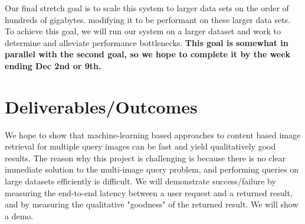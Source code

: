 Our final stretch goal is to scale this system to larger data sets on the order of hundreds of gigabytes.
modifying it to be performant on these larger data sets.
To achieve this goal, we will run our system on a larger dataset and work to determine and alleviate performance bottlenecks.
\textbf{This goal is somewhat in parallel with the second goal, so we hope to complete it by the week ending Dec 2nd or 9th.}

\section{Deliverables/Outcomes}
We hope to show that machine-learning based approaches to content based image retrieval for multiple query images can be fast and yield qualitatively good results.
The reason why this project is challenging is because there is no clear immediate solution to the multi-image query problem, and performing queries on large datasets efficiently
is difficult.
We will demonstrate success/failure by measuring the end-to-end latency between a user request and a returned result, and by measuring the qualitative "goodness" of the returned result.
We will show a demo.
